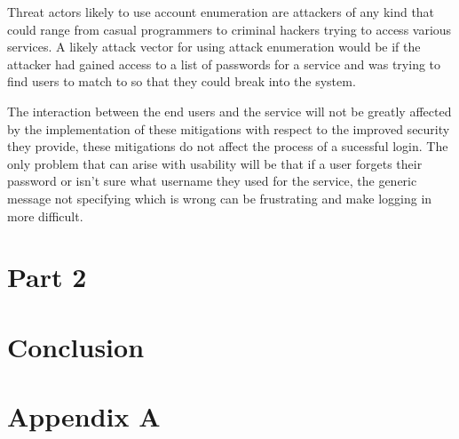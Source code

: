 \documentclass{ueacmpstyle}
\begin{document}
        Threat actors likely to use account enumeration are attackers of any kind that could 
        range from casual programmers to criminal hackers trying to access various services. 
        A likely attack vector for using attack enumeration would be if the attacker had 
        gained access to a list of passwords for a service and was trying to find users to 
        match to so that they could break into the system.

        The interaction between the end users and the service will not be greatly affected 
        by the implementation of these mitigations with respect to the improved security 
        they provide, these mitigations do not affect the process of a sucessful login. 
        The only problem that can arise with usability will be that if a user forgets their 
        password or isn't sure what username they used for the service, the generic message 
        not specifying which is wrong can be frustrating and make logging in more difficult. 

        
    \section{Part 2}\label{sec:Pt2}

    \section{Conclusion}\label{sec:Con}
    
    

    \nocite{*}
	
	
	\newpage
	
	\appendix
        \section{Appendix A}\label{app:A}   %
            \newpage
\end{document}
